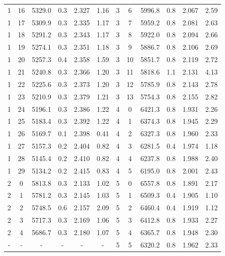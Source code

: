 \documentclass[11.5pt,a4paper,russian]{article}
\begin{document}
\begin{table}[b]
\begin{tabular}{c|c|c|c|c|c||c|c|c|c|c|c}
1 & 16 & 5329.0 & 0.3 & 2.327 & 1.16 & 3 & 6 & 5996.8 & 0.8 & 2.067 & 2.59 \\
1 & 17 & 5309.9 & 0.3 & 2.335 & 1.17 & 3 & 7 & 5959.2 & 0.8 & 2.081 & 2.63 \\
1 & 18 & 5291.2 & 0.3 & 2.343 & 1.17 & 3 & 8 & 5922.0 & 0.8 & 2.094 & 2.66 \\
1 & 19 & 5274.1 & 0.3 & 2.351 & 1.18 & 3 & 9 & 5886.7 & 0.8 & 2.106 & 2.69 \\
1 & 20 & 5257.3 & 0.4 & 2.358 & 1.59 & 3 & 10 & 5851.7 & 0.8 & 2.119 & 2.72 \\
1 & 21 & 5240.8 & 0.3 & 2.366 & 1.20 & 3 & 11 & 5818.6 & 1.1 & 2.131 & 4.13 \\
1 & 22 & 5225.6 & 0.3 & 2.373 & 1.20 & 3 & 12 & 5785.9 & 0.8 & 2.143 & 2.78 \\
1 & 23 & 5210.9 & 0.3 & 2.379 & 1.21 & 3 & 13 & 5754.3 & 0.8 & 2.155 & 2.82 \\
1 & 24 & 5196.1 & 0.3 & 2.386 & 1.22 & 4 & 0 & 6421.3 & 0.8 & 1.931 & 2.26 \\
1 & 25 & 5183.4 & 0.3 & 2.392 & 1.22 & 4 & 1 & 6374.3 & 0.8 & 1.945 & 2.29 \\
1 & 26 & 5169.7 & 0.1 & 2.398 & 0.41 & 4 & 2 & 6327.3 & 0.8 & 1.960 & 2.33 \\
1 & 27 & 5157.3 & 0.2 & 2.404 & 0.82 & 4 & 3 & 6281.5 & 0.4 & 1.974 & 1.18 \\
1 & 28 & 5145.4 & 0.2 & 2.410 & 0.82 & 4 & 4 & 6237.8 & 0.8 & 1.988 & 2.40 \\
1 & 29 & 5134.2 & 0.2 & 2.415 & 0.83 & 4 & 5 & 6195.0 & 0.8 & 2.001 & 2.43 \\
2 & 0 & 5813.8 & 0.3 & 2.133 & 1.02 & 5 & 0 & 6557.8 & 0.8 & 1.891 & 2.17 \\
2 & 1 & 5781.2 & 0.3 & 2.145 & 1.03 & 5 & 1 & 6509.3 & 0.4 & 1.905 & 1.10 \\
2 & 2 & 5748.5 & 0.6 & 2.157 & 2.09 & 5 & 2 & 6460.4 & 0.4 & 1.919 & 1.12 \\
2 & 3 & 5717.3 & 0.3 & 2.169 & 1.06 & 5 & 3 & 6412.8 & 0.8 & 1.933 & 2.27 \\
2 & 4 & 5686.7 & 0.3 & 2.180 & 1.07 & 5 & 4 & 6365.7 & 0.8 & 1.948 & 2.30 \\
- & - & - & - & - & - & 5 & 5 & 6320.2 & 0.8 & 1.962 & 2.33 \\
\bottomrule
\end{tabular}
\end{table}
\end{document}
